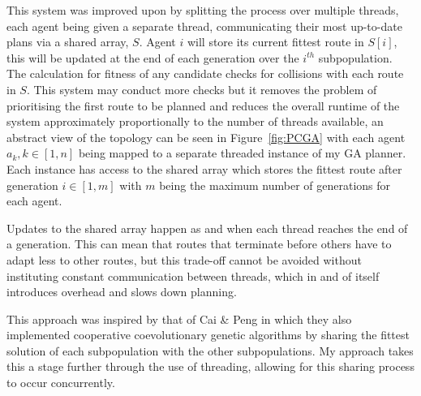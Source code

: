 This system was improved upon by splitting the process over multiple threads, each agent being given a separate thread, communicating their most up-to-date plans via a shared array, $S$. Agent $i$ will store its current fittest route in $S[i]$, this will be updated at the end of each generation over the $i^{th}$ subpopulation. The calculation for fitness of any candidate checks for collisions with each route in $S$. This system may conduct more checks but it removes the problem of prioritising the first route to be planned and reduces the overall runtime of the system approximately proportionally to the number of threads available, an abstract view of the topology can be seen in Figure~\ref{fig:PCGA} with each agent $a_{k}, k \in [1,n]$ being mapped to a separate threaded instance of my GA planner. Each instance has access to the shared array which stores the fittest route after generation $i \in [1,m]$ with $m$ being the maximum number of generations for each agent.

Updates to the shared array happen as and when each thread reaches the end of a generation. This can mean that routes that terminate before others have to adapt less to other routes, but this trade-off cannot be avoided without instituting constant communication between threads, which in and of itself introduces overhead and slows down planning.

This approach was inspired by that of Cai \& Peng\cite{caiCooperativeCoevolutionaryAdaptive2002} in which they also implemented cooperative coevolutionary genetic algorithms by sharing the fittest solution of each subpopulation with the other subpopulations. My approach takes this a stage further through the use of threading, allowing for this sharing process to occur concurrently.

